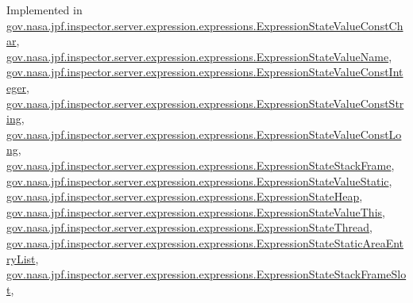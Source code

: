Implemented in \hyperlink{classgov_1_1nasa_1_1jpf_1_1inspector_1_1server_1_1expression_1_1expressions_1_1_expression_state_value_const_char_a8b8dbff87c3f81b9192355201350b701}{gov.\+nasa.\+jpf.\+inspector.\+server.\+expression.\+expressions.\+Expression\+State\+Value\+Const\+Char}, \hyperlink{classgov_1_1nasa_1_1jpf_1_1inspector_1_1server_1_1expression_1_1expressions_1_1_expression_state_value_name_a7dba9eb7d3fe67b1be856b7c890d14fd}{gov.\+nasa.\+jpf.\+inspector.\+server.\+expression.\+expressions.\+Expression\+State\+Value\+Name}, \hyperlink{classgov_1_1nasa_1_1jpf_1_1inspector_1_1server_1_1expression_1_1expressions_1_1_expression_state_value_const_integer_a49ccad06fcf3443c4f1a0306a007f320}{gov.\+nasa.\+jpf.\+inspector.\+server.\+expression.\+expressions.\+Expression\+State\+Value\+Const\+Integer}, \hyperlink{classgov_1_1nasa_1_1jpf_1_1inspector_1_1server_1_1expression_1_1expressions_1_1_expression_state_value_const_string_af7e58cc61aa1cc6e4e6b00f55f18c293}{gov.\+nasa.\+jpf.\+inspector.\+server.\+expression.\+expressions.\+Expression\+State\+Value\+Const\+String}, \hyperlink{classgov_1_1nasa_1_1jpf_1_1inspector_1_1server_1_1expression_1_1expressions_1_1_expression_state_value_const_long_afb79a67f6c4892a3a2660e9ef30926b1}{gov.\+nasa.\+jpf.\+inspector.\+server.\+expression.\+expressions.\+Expression\+State\+Value\+Const\+Long}, \hyperlink{classgov_1_1nasa_1_1jpf_1_1inspector_1_1server_1_1expression_1_1expressions_1_1_expression_state_stack_frame_acb8b5f107d7ebab62db22c7b2a9a91b0}{gov.\+nasa.\+jpf.\+inspector.\+server.\+expression.\+expressions.\+Expression\+State\+Stack\+Frame}, \hyperlink{classgov_1_1nasa_1_1jpf_1_1inspector_1_1server_1_1expression_1_1expressions_1_1_expression_state_value_static_ac8bdf9d1b21b32d12a6e6e5279cc70a6}{gov.\+nasa.\+jpf.\+inspector.\+server.\+expression.\+expressions.\+Expression\+State\+Value\+Static}, \hyperlink{classgov_1_1nasa_1_1jpf_1_1inspector_1_1server_1_1expression_1_1expressions_1_1_expression_state_heap_a1c7afc075a378e4a75dc64441f3d8dcb}{gov.\+nasa.\+jpf.\+inspector.\+server.\+expression.\+expressions.\+Expression\+State\+Heap}, \hyperlink{classgov_1_1nasa_1_1jpf_1_1inspector_1_1server_1_1expression_1_1expressions_1_1_expression_state_value_this_af1b579832ec3891431184154c683194a}{gov.\+nasa.\+jpf.\+inspector.\+server.\+expression.\+expressions.\+Expression\+State\+Value\+This}, \hyperlink{classgov_1_1nasa_1_1jpf_1_1inspector_1_1server_1_1expression_1_1expressions_1_1_expression_state_thread_a8e2420c4821522c88896def518d32f4a}{gov.\+nasa.\+jpf.\+inspector.\+server.\+expression.\+expressions.\+Expression\+State\+Thread}, \hyperlink{classgov_1_1nasa_1_1jpf_1_1inspector_1_1server_1_1expression_1_1expressions_1_1_expression_state_static_area_entry_list_adeb7b6c431edf2a46015e3b9a5e6dce6}{gov.\+nasa.\+jpf.\+inspector.\+server.\+expression.\+expressions.\+Expression\+State\+Static\+Area\+Entry\+List}, \hyperlink{classgov_1_1nasa_1_1jpf_1_1inspector_1_1server_1_1expression_1_1expressions_1_1_expression_state_stack_frame_slot_a4f04945cb68f2ad02d3fe8db36179f1f}{gov.\+nasa.\+jpf.\+inspector.\+server.\+expression.\+expressions.\+Expression\+State\+Stack\+Frame\+Slot}, 